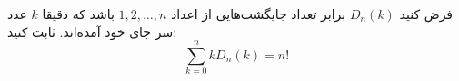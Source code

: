 \p
	فرض کنید $D_n(k)$ برابر تعداد جایگشت‌هایی از اعداد $1, 2, \dots , n$ باشد که دقیقا $k$ عدد سر جای خود آمده‌اند. ثابت کنید:
	$$\sum_{k = 0}^{n} kD_n(k) = n!$$
	
